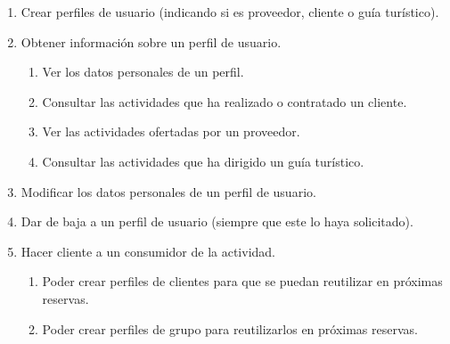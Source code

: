 \begin{enumerate}[label={\color{red}RF-\arabic{enumi}.}]
    \begin{enumerate}[label={\color{red}\theenumi\arabic{enumii}.}]

        \item\label{enum:RF-3.1} Crear perfiles de usuario (indicando si es proveedor, cliente o guía turístico).
        
        \item\label{enum:RF-3.2} Obtener información sobre un perfil de usuario.
        \begin{enumerate}[label={\color{red}\theenumii\arabic{enumiii}.}]
            \item\label{enum:RF-3.2.1} Ver los datos personales de un perfil.
            \item\label{enum:RF-3.2.2} Consultar las actividades que ha realizado o contratado un cliente.
            \item\label{enum:RF-3.2.3} Ver las actividades ofertadas por un proveedor.
            \item\label{enum:RF-3.2.4} Consultar las actividades que ha dirigido un guía turístico.
        \end{enumerate}

        \item\label{enum:RF-3.3} Modificar los datos personales de un perfil de usuario.
        
        \item\label{enum:RF-3.4} Dar de baja a un perfil de usuario (siempre que este lo haya solicitado).
        

        \item\label{enum:RF-3.5} Hacer cliente a un consumidor de la actividad. 
        \begin{enumerate}[label={\color{red}\theenumii\arabic{enumiii}.}]
            \item\label{enum:RF-3.5.1} Poder crear perfiles de clientes para que se puedan reutilizar en próximas reservas. 
            \item\label{enum:RF-3.5.2} Poder crear perfiles de grupo para reutilizarlos en próximas reservas. 
        \end{enumerate}
    \end{enumerate}



\end{enumerate}

\begin{comment}
    Perfil, jubilados, archivos multimedia
\end{comment}



